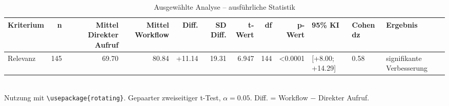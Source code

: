 \begin{table}
\centering
\caption{Ausgewählte Analyse -- ausführliche Statistik}
\begin{tabular}{lrrrrrrrrlll}
\toprule
Kriterium & n & Mittel Direkter Aufruf & Mittel Workflow & Diff. & SD Diff. & t-Wert & df & p-Wert & 95\% KI & Cohen dz & Ergebnis \\
\midrule
Relevanz & 145 & 69.70 & 80.84 & +11.14 & 19.31 & 6.947 & 144 & <0.0001 & [+8.00; +14.29] & 0.58 & signifikante Verbesserung \\
\bottomrule
\end{tabular}
\\[2mm]
\footnotesize Nutzung mit \texttt{\textbackslash usepackage\{rotating\}}. Gepaarter zweiseitiger t-Test, $\alpha=0.05$. Diff. = Workflow $-$ Direkter Aufruf.
\end{table}
